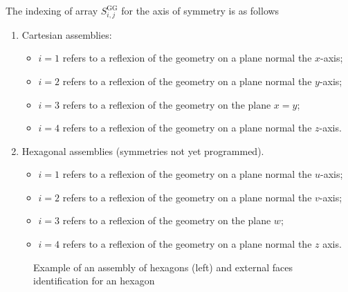The indexing of array $S^{\text{GG}}_{i,j}$ for the axis of symmetry is as follows
\begin{enumerate}
 \item Cartesian  assemblies: 
  \begin{itemize}
  \item $i=1$ refers to a reflexion of the geometry on a plane normal the $x$-axis; 
  \item $i=2$ refers to a reflexion of the geometry on a plane normal the $y$-axis; 
  \item $i=3$ refers to a reflexion of the geometry on the plane $x=y$; 
  \item $i=4$ refers to a reflexion of the geometry on a plane normal the $z$-axis. 
  \end{itemize}
\item Hexagonal assemblies (symmetries not yet programmed).
  \begin{itemize}
  \item $i=1$ refers to a reflexion of the geometry on a plane normal the $u$-axis; 
  \item $i=2$ refers to a reflexion of the geometry on a plane normal the $v$-axis; 
  \item $i=3$ refers to a reflexion of the geometry on the plane $w$; 
  \item $i=4$ refers to a reflexion of the geometry on a plane normal the $z$ axis. 
  \end{itemize}
\end{enumerate}

\begin{figure}[htbp]  
\begin{center} 
\parbox{6cm}{\epsfxsize=6cm }\hspace{1.0cm} \parbox{6cm}{\epsfxsize=6cm }
\caption{Example of an assembly of hexagons (left) and external faces identification for an hexagon}\label{fig:HexAssmbR}   
\end{center}  
\end{figure}


